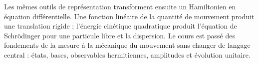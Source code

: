 Les mêmes outils de représentation transforment ensuite un Hamiltonien en équation différentielle. Une fonction linéaire de la quantité de mouvement produit une translation rigide ; l’énergie cinétique quadratique produit l’équation de Schr\"odinger pour une particule libre et la dispersion. Le cours est passé des fondements de la mesure à la mécanique du mouvement sans changer de langage central : états, bases, observables hermitiennes, amplitudes et évolution unitaire.
